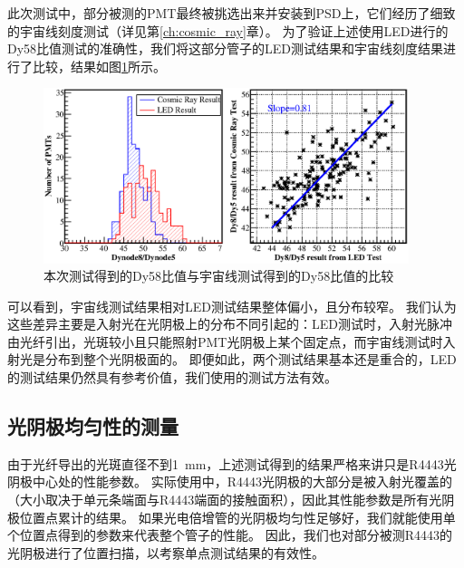 此次测试中，部分被测的PMT最终被挑选出来并安装到PSD上，它们经历了细致的宇宙线刻度测试（详见第\ref{ch:cosmic_ray}章）。
为了验证上述使用LED进行的Dy58比值测试的准确性，我们将这部分管子的LED测试结果和宇宙线刻度结果进行了比较，结果如图\ref{fig:pmt_test:dy58_ledvscm}所示。
\begin{figure}[htbp]
	\centering
	\includegraphics[width=0.95\textwidth]{chap/pmt_test/fig/dy58_ledvscm.eps}
	\caption{本次测试得到的Dy58比值与宇宙线测试得到的Dy58比值的比较}
	\label{fig:pmt_test:dy58_ledvscm}
\end{figure}
可以看到，宇宙线测试结果相对LED测试结果整体偏小，且分布较窄。
我们认为这些差异主要是入射光在光阴极上的分布不同引起的：LED测试时，入射光脉冲由光纤引出，光斑较小且只能照射PMT光阴极上某个固定点，而宇宙线测试时入射光是分布到整个光阴极面的。
即便如此，两个测试结果基本还是重合的，LED的测试结果仍然具有参考价值，我们使用的测试方法有效。

\subsection{光阴极均匀性的测量}
\label{sec:pmt_test:cathode_scanning}
由于光纤导出的光斑直径不到\SI{1}{mm}，上述测试得到的结果严格来讲只是R4443光阴极中心处的性能参数。
实际使用中，R4443光阴极的大部分是被入射光覆盖的（大小取决于单元条端面与R4443端面的接触面积），因此其性能参数是所有光阴极位置点累计的结果。
如果光电倍增管的光阴极均匀性足够好，我们就能使用单个位置点得到的参数来代表整个管子的性能。
因此，我们也对部分被测R4443的光阴极进行了位置扫描，以考察单点测试结果的有效性。

